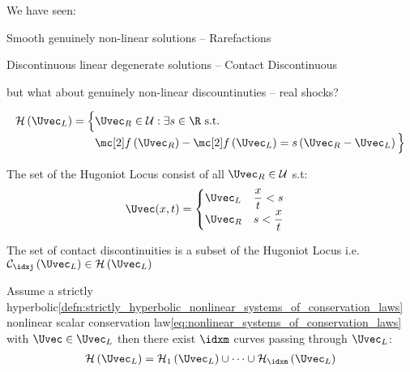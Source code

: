 \begin{sectionbox}\nospacing
    We have seen:
    \begin{itemizenosep}
        \item Smooth genuinely non-linear solutions -- Rarefactions
        \item Discontinuous linear degenerate solutions -- Contact Discontinuous
    \end{itemizenosep}
    but what about genuinely non-linear discountinuties -- real shocks?
\end{sectionbox}
\begin{defnbox}\nospacing
    \begin{defn}\label{defn:hugoniot_locus}
        \begin{align}
          \mathcal{H}\left(\Uvec_{L}\right)=\Big\{&\Uvec_{R}\in\admissibleset:\exists s\in\R\text{ s.t. }\nonumber\\[-1\jot]
          &\flux\left(\Uvec_{R}\right)-\flux\left(\Uvec_{L}\right)=s \left(\Uvec_{R}-\Uvec_{L}\right)\Big\}\label{eq:hugoniot_locus}
        \end{align}
    \end{defn}
\end{defnbox}
\begin{notebox}[Notes]\nospacing
   \begin{itemizenosep}
       \item The set of the Hugoniot Locus consist of all $\Uvec_{R}\in\admissibleset$ s.t:
        \begin{align*}
          &\Uvec(x,t)=
          \left\{\begin{aligned}
              &\Uvec_{L}&&\frac{x}{t}<s \\[-1\jot]
              &\Uvec_{R}&&s<\frac{x}{t}
          \end{aligned}\right.
        \end{align*}\hfill
       \item The set of contact discontinuities is a subset of the Hugoniot Locus i.e. $\mathcal{C}_{\idxj}\left(\Uvec_{L}\right)\in\mathcal{H}\left(\Uvec_{L}\right)$
   \end{itemizenosep}
\end{notebox}
\begin{lemmabox}\nospacing
    \begin{lemma}
        Assume a strictly hyperbolic\cref{defn:strictly_hyperbolic_nonlinear_systems_of_conservation_laws} nonlinear scalar conservation law\cref{eq:nonlinear_systems_of_conservation_laws} with $\Uvec\in\Uvec_{L}$ then there exist $\idxm$ curves passing through $\Uvec_{L}$:
        \begin{align}
          \mathcal{H}\left(\Uvec_{L}\right)=\mathcal{H}_{1}\left(\Uvec_{L}\right)\cup\cdots\cup\mathcal{H}_{\idxm}\left(\Uvec_{L}\right)
        \end{align}
    \end{lemma}
\end{lemmabox}
